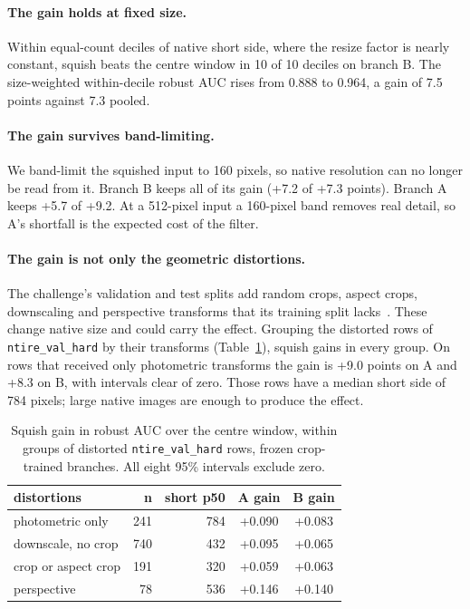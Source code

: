 \documentclass[10pt,twocolumn,letterpaper]{article}
\begin{document}
\paragraph{The gain holds at fixed size.} Within equal-count deciles of native
short side, where the resize factor is nearly constant, squish beats the
centre window in 10 of 10 deciles on branch B. The size-weighted
within-decile robust AUC rises from 0.888 to 0.964, a gain of 7.5 points
against 7.3 pooled.

\paragraph{The gain survives band-limiting.} We band-limit the squished input
to 160 pixels, so native resolution can no longer be read from it. Branch B
keeps all of its gain (+7.2 of +7.3 points). Branch A keeps +5.7 of +9.2. At a
512-pixel input a 160-pixel band removes real detail, so A's shortfall is the
expected cost of the filter.

\paragraph{The gain is not only the geometric distortions.} The challenge's
validation and test splits add random crops, aspect crops, downscaling and
perspective transforms that its training split lacks~\cite{gushchin2026ntire}.
These change native size and could carry the effect. Grouping the distorted
rows of \texttt{ntire\_val\_hard} by their transforms
(Table~\ref{tab:groups}), squish gains in every group. On rows that received
only photometric transforms the gain is +9.0 points on A and +8.3 on B, with
intervals clear of zero. Those rows have a median short side of 784 pixels;
large native images are enough to produce the effect.

\begin{table}[t]
\centering
\small
\setlength{\tabcolsep}{3pt}
\begin{tabular}{lrrcc}
\toprule
distortions & n & short p50 & A gain & B gain \\
\midrule
photometric only & 241 & 784 & +0.090 & +0.083 \\
downscale, no crop & 740 & 432 & +0.095 & +0.065 \\
crop or aspect crop & 191 & 320 & +0.059 & +0.063 \\
perspective & 78 & 536 & +0.146 & +0.140 \\
\bottomrule
\end{tabular}
\caption{Squish gain in robust AUC over the centre window, within groups of
distorted \texttt{ntire\_val\_hard} rows, frozen crop-trained branches. All
eight 95\% intervals exclude zero.}
\label{tab:groups}
\end{table}
\end{document}
